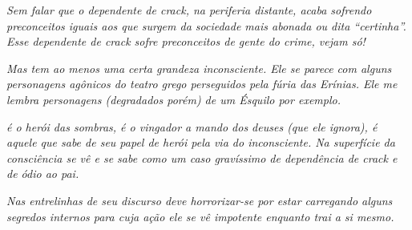 \emph{Sem falar que o dependente de crack, na periferia distante, acaba
sofrendo preconceitos iguais aos que surgem da sociedade mais abonada ou
dita ``certinha''. Esse dependente de crack sofre preconceitos de
gente do crime, vejam só!}

\emph{Mas  tem ao menos uma certa grandeza inconsciente. Ele se parece
com alguns personagens agônicos do teatro grego perseguidos pela fúria
das Erínias. Ele me lembra personagens (degradados porém) de um Ésquilo
por exemplo.}

\emph{ é o herói das sombras, é o vingador a mando dos deuses (que ele
ignora), é aquele que sabe de seu papel de herói pela via do
inconsciente. Na superfície da consciência  se vê e se sabe como um
caso gravíssimo de dependência de crack e de ódio ao pai.}

\emph{Nas entrelinhas de seu discurso  deve horrorizar-se por estar
carregando alguns segredos internos para cuja ação ele se vê impotente
enquanto trai a si mesmo. ~~}
\endgroup